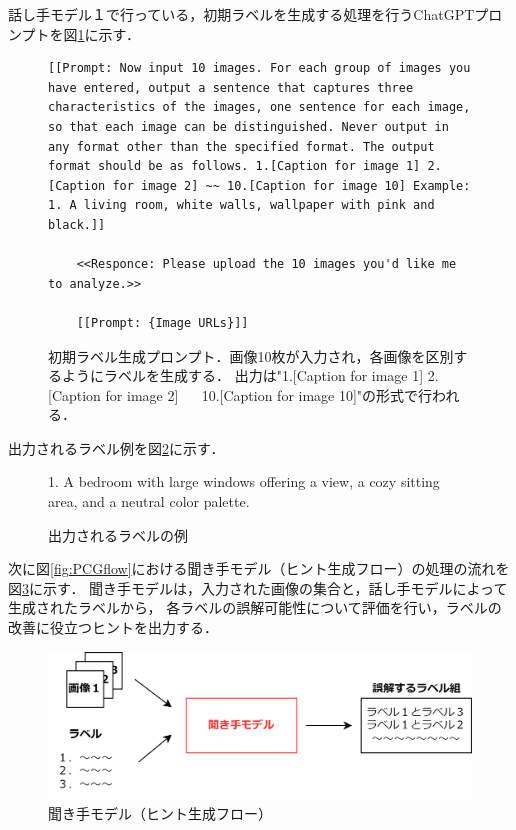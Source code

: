 \documentclass[a4paper,11pt]{jreport}
\begin{document}
話し手モデル１で行っている，初期ラベルを生成する処理を行うChatGPTプロンプトを図\ref{fig:prompt_speaker1}に示す．


\begin{figure}[h]
  \centering
  \begin{mdframed}
  \begin{lstlisting}[style=chatgptstyle]
    [[Prompt: Now input 10 images. For each group of images you have entered, output a sentence that captures three characteristics of the images, one sentence for each image, so that each image can be distinguished. Never output in any format other than the specified format. The output format should be as follows. 1.[Caption for image 1] 2.[Caption for image 2] ~~ 10.[Caption for image 10] Example: 1. A living room, white walls, wallpaper with pink and black.]]

    <<Responce: Please upload the 10 images you'd like me to analyze.>>

    [[Prompt: {Image URLs}]]
  \end{lstlisting}
  \end{mdframed}
  \caption{初期ラベル生成プロンプト．画像10枚が入力され，各画像を区別するようにラベルを生成する．
  出力は"1.[Caption for image 1] 2.[Caption for image 2] ~~ 10.[Caption for image 10]"の形式で行われる．}
  \label{fig:prompt_speaker1}
\end{figure}

出力されるラベル例を図\ref{fig:firstlabel_example}に示す．

\begin{figure}[H]
  \begin{mdframed}[linewidth=1pt]
    1. A bedroom with large windows offering a view, a cozy sitting area, and a neutral color palette.
  \end{mdframed}
  \caption{出力されるラベルの例}
  \label{fig:firstlabel_example}
\end{figure}



次に図\ref{fig:PCGflow}における聞き手モデル（ヒント生成フロー）の処理の流れを図\ref{fig:PCGlistener}に示す．
聞き手モデルは，入力された画像の集合と，話し手モデルによって生成されたラベルから，
各ラベルの誤解可能性について評価を行い，ラベルの改善に役立つヒントを出力する．

\begin{figure}[H]
	\centering
	\includegraphics[width=0.8\linewidth]{figures/PCGlistener.png}
	\caption{聞き手モデル（ヒント生成フロー）}
	\label{fig:PCGlistener}
\end{figure}
\end{document}
